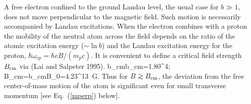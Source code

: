 A free electron confined to the ground Landau level, the usual case for 
$b\gg 1$, does not move perpendicular to the magnetic field. Such motion
is necessarily accompanied by Landau excitations. 
When the electron combines with a proton the mobility of the neutral 
atom across the field depends on the ratio of the atomic excitation energy 
($\sim \ln b$) and the Landau excitation energy for the proton,
$\hbar\omega_{cp}=\hbar eB/(m_pc)$. It is convenient to 
define a critical field strength $B_{\rm cm}$ via
(Lai and Salpeter 1995).
\be
b_{\rm cm}\ln b_{\rm cm}=1.80^4;\qquad
B_{\rm cm}=b_{\rm cm}B_0=4.23^{13}~{\rm G}.
\label{bcrit}\ee
Thus for $B\go B_{\rm cm}$, the deviation from the free 
center-of-mass motion of the atom is significant even for
small transverse momentum [see Eq.~(\ref{mperp}) below].

